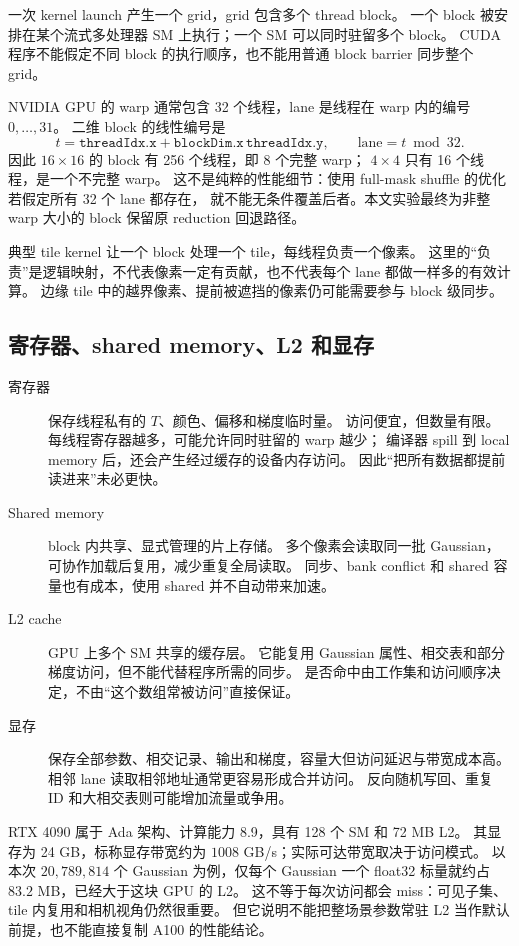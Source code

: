 一次 kernel launch 产生一个 grid，grid 包含多个 thread block。
一个 block 被安排在某个流式多处理器 SM 上执行；一个 SM 可以同时驻留多个 block。
CUDA 程序不能假定不同 block 的执行顺序，也不能用普通 block barrier 同步整个 grid。

NVIDIA GPU 的 warp 通常包含 32 个线程，lane 是线程在 warp 内的编号 $0,\ldots,31$。
二维 block 的线性编号是
\begin{equation}
 t=\texttt{threadIdx.x}
   +\texttt{blockDim.x}\,\texttt{threadIdx.y},\qquad
 \text{lane}=t\bmod32.
\end{equation}
因此 $16\times16$ 的 block 有 256 个线程，即 8 个完整 warp；
$4\times4$ 只有 16 个线程，是一个不完整 warp。
这不是纯粹的性能细节：使用 full-mask shuffle 的优化若假定所有 32 个 lane 都存在，
就不能无条件覆盖后者。本文实验最终为非整 warp 大小的 block 保留原 reduction 回退路径。

典型 tile kernel 让一个 block 处理一个 tile，每线程负责一个像素。
这里的“负责”是逻辑映射，不代表像素一定有贡献，也不代表每个 lane 都做一样多的有效计算。
边缘 tile 中的越界像素、提前被遮挡的像素仍可能需要参与 block 级同步。

\subsection{寄存器、shared memory、L2 和显存}

\begin{description}
 \item[寄存器] 保存线程私有的 $T$、颜色、偏移和梯度临时量。
 访问便宜，但数量有限。每线程寄存器越多，可能允许同时驻留的 warp 越少；
 编译器 spill 到 local memory 后，还会产生经过缓存的设备内存访问。
 因此“把所有数据都提前读进来”未必更快。
 \item[Shared memory] block 内共享、显式管理的片上存储。
 多个像素会读取同一批 Gaussian，可协作加载后复用，减少重复全局读取。
 同步、bank conflict 和 shared 容量也有成本，使用 shared 并不自动带来加速。
 \item[L2 cache] GPU 上多个 SM 共享的缓存层。
 它能复用 Gaussian 属性、相交表和部分梯度访问，但不能代替程序所需的同步。
 是否命中由工作集和访问顺序决定，不由“这个数组常被访问”直接保证。
 \item[显存] 保存全部参数、相交记录、输出和梯度，容量大但访问延迟与带宽成本高。
 相邻 lane 读取相邻地址通常更容易形成合并访问。
 反向随机写回、重复 ID 和大相交表则可能增加流量或争用。
\end{description}

RTX 4090 属于 Ada 架构、计算能力 8.9，具有 128 个 SM 和 72 MB L2。
其显存为 24 GB，标称显存带宽约为 $1008$ GB/s；实际可达带宽取决于访问模式。
以本次 $20{,}789{,}814$ 个 Gaussian 为例，仅每个 Gaussian 一个 float32 标量就约占
$83.2$ MB，已经大于这块 GPU 的 L2。
这不等于每次访问都会 miss：可见子集、tile 内复用和相机视角仍然很重要。
但它说明不能把整场景参数常驻 L2 当作默认前提，也不能直接复制 A100 的性能结论。

